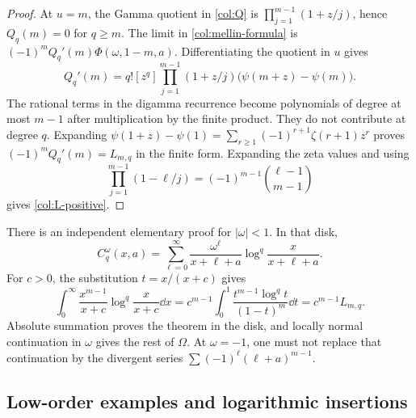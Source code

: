 \begin{proof}
At $u=m$, the Gamma quotient in \eqref{col:Q} is
$\prod_{j=1}^{m-1}(1+z/j)$, hence $Q_q(m)=0$ for $q\ge m$.
The limit in \eqref{col:mellin-formula} is
$(-1)^m Q_q'(m)\Phi(\omega,1-m,a)$.
Differentiating the quotient in $u$ gives
\[
 Q_q'(m)=q![z^q]\prod_{j=1}^{m-1}(1+z/j)
                      \bigl(\psi(m+z)-\psi(m)\bigr).
\]
The rational terms in the digamma recurrence become polynomials
of degree at most $m-1$ after multiplication by the finite product.
They do not contribute at degree $q$. Expanding
$\psi(1+z)-\psi(1)=\sum_{r\ge1}(-1)^{r+1}\zeta(r+1)z^r$
proves $(-1)^mQ_q'(m)=L_{m,q}$ in the finite form.
Expanding the zeta values and using
\[
 \prod_{j=1}^{m-1}(1-\ell/j)
       =(-1)^{m-1}\binom{\ell-1}{m-1}
\]
gives \eqref{col:L-positive}.
\end{proof}

There is an independent elementary proof for $|\omega|<1$.
In that disk,
\begin{equation}\label{col:elementary-series}
 C_q^\omega(x,a)=\sum_{\ell=0}^\infty
  \frac{\omega^\ell}{x+\ell+a}
           \log^q\!\frac{x}{x+\ell+a}.
\end{equation}
For $c>0$, the substitution $t=x/(x+c)$ gives
\begin{equation}\label{col:elementary-moment}
 \int_0^\infty\frac{x^{m-1}}{x+c}
                  \log^q\!\frac{x}{x+c}\dd x
 =c^{m-1}\int_0^1\frac{t^{m-1}\log^q t}{(1-t)^m}\dd t
 =c^{m-1}L_{m,q}.
\end{equation}
Absolute summation proves the theorem in the disk, and locally normal
continuation in $\omega$ gives the rest of $\Omega$. At $\omega=-1$,
one must not replace that continuation by the divergent series
$\sum(-1)^\ell(\ell+a)^{m-1}$.

\subsection{Low-order examples and logarithmic insertions}

